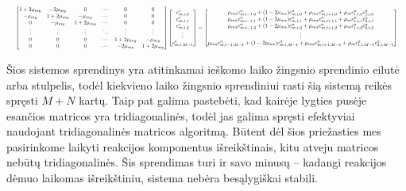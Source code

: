 \begin{align} \label{eqs:adi-system-next}
  \resizebox{\textwidth}{!}{$
  \begin{bmatrix}
    1 + 2\mu_{my} & -2\mu_{my} & 0 & \cdots & 0 & 0\\
    -\mu_{my} & 1 + 2\mu_{my} & -\mu_{my} & \cdots & 0 & 0\\
    0 & -\mu_{my} & 1 + 2\mu_{my} & \cdots & 0 & 0\\
    \vdots & \vdots & \vdots & \ddots & \vdots & \vdots\\
    0 & 0 & 0 & \cdots & 1 + 2\mu_{my} & -\mu_{my}\\
    0 & 0 & 0 & \cdots & -2\mu_{my} & 1 + 2\mu_{my}
  \end{bmatrix}
  \begin{bmatrix}
    c^*_{m,i,0}\\
    c^*_{m,i,1}\\
    c^*_{m,i,2}\\
    \vdots\\
    c^*_{m,i,M-1}
  \end{bmatrix}
  =
  \begin{bmatrix}
    \mu_{mx}c^n_{m,i-1,0}+(1-2\mu_{mx})c^n_{m,i,0}+\mu_{mx}c^n_{m,i+1,0}+\mu_m c^n_{1,i,0}c^n_{2,i,0}\\
    \mu_{mx}c^n_{m,i-1,1}+(1-2\mu_{mx})c^n_{m,i,1}+\mu_{mx}c^n_{m,i+1,1}+\mu_m c^n_{1,i,1}c^n_{2,i,1}\\
    \mu_{mx}c^n_{m,i-1,2}+(1-2\mu_{mx})c^n_{m,i,2}+\mu_{mx}c^n_{m,i+1,2}+\mu_m c^n_{1,i,2}c^n_{2,i,2}\\
    \vdots\\
    \mu_{mx}c^n_{m,i-1,M-1}+(1-2\mu_{mx})c^n_{m,i,M-1}+\mu_{mx}c^n_{m,i+1,M-1}+\mu_m c^n_{1,i,M-1}c^n_{2,i,M-1}
  \end{bmatrix}
  $}
\end{align}

Šios sistemos sprendinys yra atitinkamai ieškomo laiko žingsnio sprendinio eilutė arba stulpelis, todėl kiekvieno laiko žingsnio sprendiniui rasti šią sistemą reikės spręsti $M + N$ kartų. Taip pat galima pastebėti, kad kairėje lygties pusėje esančios matricos yra tridiagonalinės, todėl jas galima spręsti efektyviai naudojant tridiagonalinės matricos algoritmą. Būtent dėl šios priežasties mes pasirinkome laikyti reakcijos komponentus išreikštinais, kitu atveju matricos nebūtų tridiagonalinės. Šis sprendimas turi ir savo minusų -- kadangi reakcijos dėmuo laikomas išreikštiniu, sistema nebėra besąlygiškai stabili.
